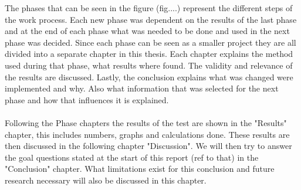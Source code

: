 The phases that can be seen in the figure (fig....) represent the different steps of the work process. Each new phase was dependent on the results of the last phase and at the end of each phase what was needed to be done and used in the next phase was decided. Since each phase can be seen as a smaller project they are all divided into a separate chapter in this thesis. Each chapter explains the method used during that phase, what results where found. The validity and relevance of the results are discussed. Lastly, the conclusion explains what was changed were implemented and why. Also what information that was selected for the next phase and how that influences it is explained. 
\\\\
Following the Phase chapters the results of the test are shown in the "Results" chapter, this includes numbers, graphs and calculations done. These results are then discussed in the following chapter "Discussion". We will then try to answer the goal questions stated at the start of this report (ref to that) in the "Conclusion" chapter. What limitations exist for this conclusion and future research necessary will also be discussed in this chapter. 
